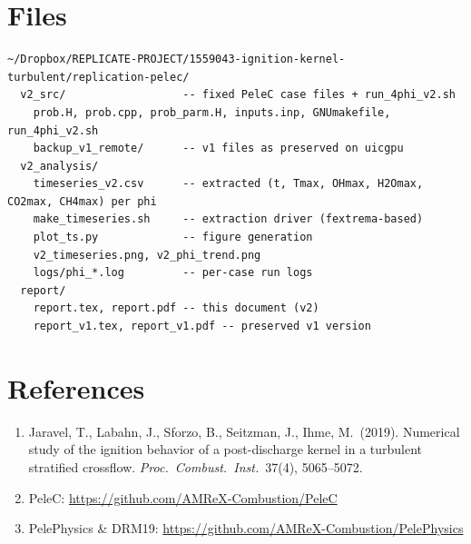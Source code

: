 \documentclass[11pt,a4paper]{article}
\begin{document}
\section{Files}
\begin{verbatim}
~/Dropbox/REPLICATE-PROJECT/1559043-ignition-kernel-turbulent/replication-pelec/
  v2_src/                  -- fixed PeleC case files + run_4phi_v2.sh
    prob.H, prob.cpp, prob_parm.H, inputs.inp, GNUmakefile, run_4phi_v2.sh
    backup_v1_remote/      -- v1 files as preserved on uicgpu
  v2_analysis/
    timeseries_v2.csv      -- extracted (t, Tmax, OHmax, H2Omax, CO2max, CH4max) per phi
    make_timeseries.sh     -- extraction driver (fextrema-based)
    plot_ts.py             -- figure generation
    v2_timeseries.png, v2_phi_trend.png
    logs/phi_*.log         -- per-case run logs
  report/
    report.tex, report.pdf -- this document (v2)
    report_v1.tex, report_v1.pdf -- preserved v1 version
\end{verbatim}

\section*{References}
\begin{enumerate}[leftmargin=*]
\item Jaravel, T., Labahn, J., Sforzo, B., Seitzman, J., Ihme, M.\ (2019). Numerical study of the ignition
      behavior of a post-discharge kernel in a turbulent stratified crossflow.
      \emph{Proc.\ Combust.\ Inst.}\ 37(4), 5065--5072.
\item PeleC: \url{https://github.com/AMReX-Combustion/PeleC}
\item PelePhysics \& DRM19: \url{https://github.com/AMReX-Combustion/PelePhysics}
\end{enumerate}
\end{document}
